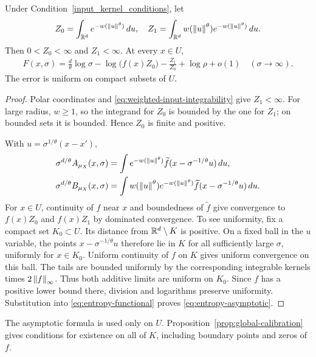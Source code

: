 \begin{lemma}\label{lem:entropy-asymptotic}
Under Condition~\ref{input_kernel_conditions}, let
\begin{align}\label{eq:rescaled-constants}
Z_0=\int_{\mathbb{R}^d}e^{-w(\left\lVert u\right\rVert^\theta)}\,d u,
\quad
Z_1=\int_{\mathbb{R}^d}w(\left\lVert u\right\rVert^\theta)e^{-w(\left\lVert u\right\rVert^\theta)}\,d u.
\end{align}
Then $0<Z_0<\infty$ and $Z_1<\infty$. At every $x\in U$,
\begin{align}\label{eq:entropy-asymptotic}
F(x,\sigma)=\frac d\theta\log\sigma-\log\bigl(f(x)Z_0\bigr)
-\frac{Z_1}{Z_0}+\log\rho+o(1)
\quad(\sigma\to\infty).
\end{align}
The error is uniform on compact subsets of $U$.
\end{lemma}
\begin{proof}
Polar coordinates and \eqref{eq:weighted-input-integrability} give $Z_1<\infty$. For large radius, $w\geq1$, so the integrand for $Z_0$ is bounded by the one for $Z_1$; on bounded sets it is bounded. Hence $Z_0$ is finite and positive.

With $u=\sigma^{1/\theta}(x-x')$,
\begin{align}
\sigma^{d/\theta}A_{\mu_X}(x,\sigma)
&=\int e^{-w(\left\lVert u\right\rVert^\theta)}\widetilde f(x-\sigma^{-1/\theta}u)\,d u,\\
\sigma^{d/\theta}B_{\mu_X}(x,\sigma)
&=\int w(\left\lVert u\right\rVert^\theta)e^{-w(\left\lVert u\right\rVert^\theta)}
\widetilde f(x-\sigma^{-1/\theta}u)\,d u.
\end{align}
For $x\in U$, continuity of $f$ near $x$ and boundedness of $\widetilde f$ give convergence to $f(x)Z_0$ and $f(x)Z_1$ by dominated convergence. To see uniformity, fix a compact set $K_0\subset U$. Its distance from $\mathbb{R}^d\setminus K$ is positive. On a fixed ball in the $u$ variable, the points $x-\sigma^{-1/\theta}u$ therefore lie in $K$ for all sufficiently large $\sigma$, uniformly for $x\in K_0$. Uniform continuity of $f$ on $K$ gives uniform convergence on this ball. The tails are bounded uniformly by the corresponding integrable kernels times $2\left\lVert f\right\rVert_\infty$. Thus both additive limits are uniform on $K_0$. Since $f$ has a positive lower bound there, division and logarithms preserve uniformity. Substitution into \eqref{eq:entropy-functional} proves \eqref{eq:entropy-asymptotic}.
\end{proof}
The asymptotic formula is used only on $U$. Proposition~\ref{prop:global-calibration} gives conditions for existence on all of $K$, including boundary points and zeros of $f$.


